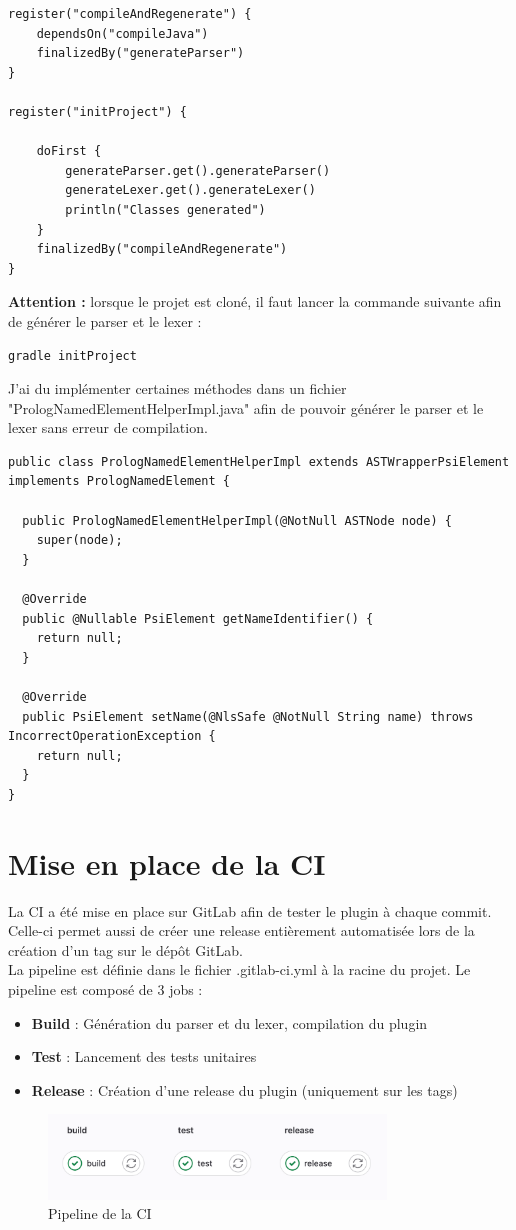 \begin{lstlisting}[caption={Code Gradle pour l'initilisation du projet}, label={lst:project_init_gradle}]
register("compileAndRegenerate") {
    dependsOn("compileJava")
    finalizedBy("generateParser")
}

register("initProject") {

    doFirst {
        generateParser.get().generateParser()
        generateLexer.get().generateLexer()
        println("Classes generated")
    }
    finalizedBy("compileAndRegenerate")
}
\end{lstlisting}

\noindent \textbf{Attention :} lorsque le projet est cloné, il faut lancer la commande suivante afin de générer le parser et le lexer :
\begin{lstlisting}[caption={Initialisation du projet}, label={lst:project_init}]
    gradle initProject
\end{lstlisting}

\noindent J'ai du implémenter certaines méthodes dans un fichier "PrologNamedElementHelperImpl.java" afin de pouvoir générer le parser et le lexer sans erreur de compilation.

\begin{lstlisting}[caption={Code permettant de supprimer les erreurs de compilation}, label={lst:code_error_compilation}]
public class PrologNamedElementHelperImpl extends ASTWrapperPsiElement implements PrologNamedElement {

  public PrologNamedElementHelperImpl(@NotNull ASTNode node) {
    super(node);
  }

  @Override
  public @Nullable PsiElement getNameIdentifier() {
    return null;
  }

  @Override
  public PsiElement setName(@NlsSafe @NotNull String name) throws IncorrectOperationException {
    return null;
  }
}
\end{lstlisting}


\section{Mise en place de la CI}
\noindent La CI a été mise en place sur GitLab afin de tester le plugin à chaque commit.
Celle-ci permet aussi de créer une release entièrement automatisée lors de la création d'un tag sur le dépôt GitLab.
\\ \noindent La pipeline est définie dans le fichier .gitlab-ci.yml à la racine du projet.
\newdoubleline
\noindent Le pipeline est composé de 3 jobs :
\begin{itemize}
    \item \textbf{Build} : Génération du parser et du lexer, compilation du plugin
    \item \textbf{Test} : Lancement des tests unitaires
    \item \textbf{Release} : Création d'une release du plugin (uniquement sur les tags)
\end{itemize}

\begin{figure}[H]
    \centering
    \includegraphics[width=0.8\textwidth]{images/Pipeline.png}
    \caption{Pipeline de la CI}
    \label{fig:gitlab-ci}
\end{figure}
